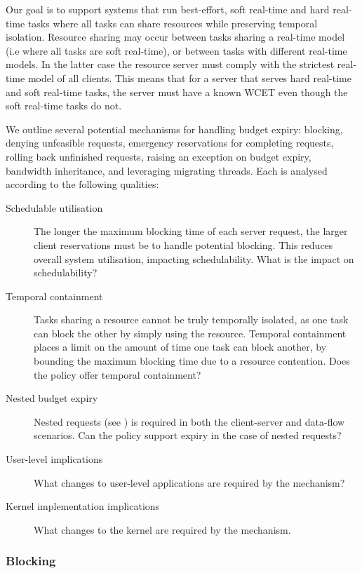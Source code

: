 Our goal is to support systems that run best-effort, soft real-time and hard real-time tasks where all tasks can share resources while preserving temporal isolation.
Resource sharing may occur between tasks sharing a real-time model (i.e where all tasks are soft real-time), or between tasks with different real-time models.
In the latter case the resource server must comply with the strictest real-time model of all clients.
This means that for a server that serves hard real-time and soft real-time tasks, the server must have a known \gls{WCET} even though the soft real-time tasks do not.

We outline several potential mechanisms for handling budget expiry: blocking, denying unfeasible requests, emergency reservations for completing requests, rolling back unfinished requests, raising an exception on budget expiry, bandwidth inheritance, and leveraging migrating threads.
Each is analysed according to the following qualities:

\begin{description}
    \item[Schedulable utilisation] The longer the maximum blocking time of each server request, the larger client reservations must be to handle potential blocking. This reduces overall system utilisation, impacting schedulability. What is the impact on schedulability?
    \item[Temporal containment] Tasks sharing a resource cannot be truly temporally isolated, as one task can block the other by simply using the resource. Temporal containment places a limit on the amount of time one task can block another, by bounding the maximum blocking time due to a resource contention. Does the policy offer temporal containment?
	\item[Nested budget expiry] Nested requests (see ) is required in both the client-server and data-flow scenarios. Can the policy support expiry in the case of nested requests?
    \item[User-level implications] What changes to user-level applications are required by the mechanism?
    \item[Kernel implementation implications] What changes to the kernel are required by the mechanism.
\end{description}


\subsubsection{Blocking}


